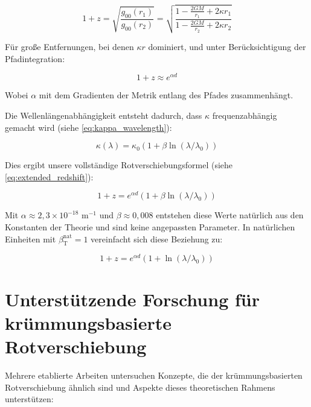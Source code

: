 \documentclass[12pt,a4paper]{article}
\newcommand{\betaT}{\beta_{\text{T}}}
\begin{document}
	\begin{equation}
		1 + z = \sqrt{\frac{g_{00}(r_1)}{g_{00}(r_2)}} = \sqrt{\frac{1 - \frac{2GM}{r_1} + 2\kappa r_1}{1 - \frac{2GM}{r_2} + 2\kappa r_2}}
	\end{equation}
	
	Für große Entfernungen, bei denen $\kappa r$ dominiert, und unter Berücksichtigung der Pfadintegration\cite{pascher_messdifferenzen_2025}:
	
	\begin{equation}
		\label{eq:base_redshift}
		1 + z \approx e^{\alpha d}
	\end{equation}
	
	Wobei $\alpha$ mit dem Gradienten der Metrik entlang des Pfades zusammenhängt.
	
	Die Wellenlängenabhängigkeit entsteht dadurch, dass $\kappa$ frequenzabhängig gemacht wird (siehe \cref{eq:kappa_wavelength}):
	
	\begin{equation}
		\kappa(\lambda) = \kappa_0(1 + \beta \ln(\lambda/\lambda_0))
	\end{equation}
	
	Dies ergibt unsere vollständige Rotverschiebungsformel (siehe \cref{eq:extended_redshift}):
	
	\begin{equation}
		1 + z = e^{\alpha d}(1 + \beta \ln(\lambda/\lambda_0))
	\end{equation}
	
	Mit $\alpha \approx 2,3\times10^{-18}$ m$^{-1}$ und $\beta \approx 0,008$ entstehen diese Werte natürlich aus den Konstanten der Theorie und sind keine angepassten Parameter\cite{pascher_params_2025}. In natürlichen Einheiten mit $\betaT^{\text{nat}} = 1$ vereinfacht sich diese Beziehung zu\cite{pascher_alphabeta_2025}:
	
	\begin{equation}
		\label{eq:natural_redshift}
		1 + z = e^{\alpha d}(1 + \ln(\lambda/\lambda_0))
	\end{equation}
	
	\section{Unterstützende Forschung für krümmungsbasierte Rotverschiebung}
	\label{sec:supporting_research}
	
	Mehrere etablierte Arbeiten untersuchen Konzepte, die der krümmungsbasierten Rotverschiebung ähnlich sind und Aspekte dieses theoretischen Rahmens unterstützen:
	
\end{document}
